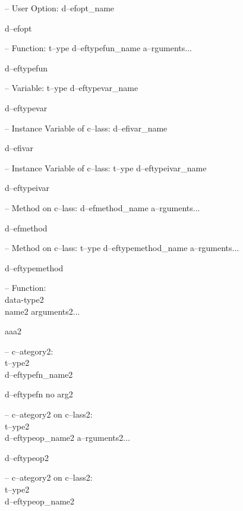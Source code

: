 \documentclass{book}
\begin{document}
\begin{titlepage}
\hbox{}-- User Option: d--efopt\_name


%
d--efopt

\hbox{}-- Function: t--ype d--eftypefun\_name a--rguments...


%
d--eftypefun

\hbox{}-- Variable: t--ype d--eftypevar\_name


%
d--eftypevar

\hbox{}-- Instance Variable of c--lass: d--efivar\_name


%
d--efivar

\hbox{}-- Instance Variable of c--lass: t--ype d--eftypeivar\_name


%
d--eftypeivar

\hbox{}-- Method on c--lass: d--efmethod\_name a--rguments...


%
d--efmethod

\hbox{}-- Method on c--lass: t--ype d--eftypemethod\_name a--rguments...


%
d--eftypemethod


\hbox{}-- Function:\leavevmode{}\\data-type2\leavevmode{}\\name2 arguments2...


%
aaa2

\hbox{}-- c--ategory2:\leavevmode{}\\t--ype2\leavevmode{}\\d--eftypefn\_name2


%
d--eftypefn no arg2

\hbox{}-- c--ategory2 on c--lass2:\leavevmode{}\\t--ype2\leavevmode{}\\d--eftypeop\_name2 a--rguments2...


%
d--eftypeop2

\hbox{}-- c--ategory2 on c--lass2:\leavevmode{}\\t--ype2\leavevmode{}\\d--eftypeop\_name2



\end{titlepage}
\end{document}
